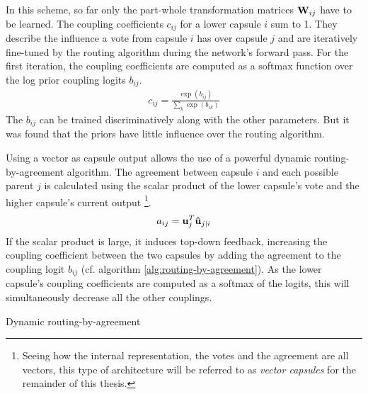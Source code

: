 In this scheme, so far only the part-whole transformation matrices $\vb{W}_{ij}$ have to be learned. The coupling coefficients $c_{ij}$ for a lower capsule $i$ sum to 1. They describe the influence a vote from capsule $i$ has over capsule $j$ and are iteratively fine-tuned by the routing algorithm during the network's forward pass. For the first iteration, the coupling coefficients are computed as a softmax function over the log prior coupling logits $b_{ij}$.
\begin{align}
    c_{ij} = \frac{\exp(b_{ij})}{\sum_k \exp(b_{ik})}
    \label{eq:coupling-coeff}
\end{align}
The $b_{ij}$ can be trained discriminatively along with the other parameters. But it was found that the priors have little influence over the routing algorithm.

Using a vector as capsule output allows the use of a powerful dynamic routing-by-agreement algorithm. The agreement between capsule $i$ and each possible parent $j$ is calculated using the scalar product of the lower capsule's vote and the higher capsule's current output \footnote{Seeing how the internal representation, the votes and the agreement are all vectors, this type of architecture will be referred to as \emph{vector capsules} for the remainder of this thesis.}.
\begin{align}
    a_{ij} = \vb{u}_j^T \vb{\hat{u}}_{j|i}
\end{align}
If the scalar product is large, it induces top-down feedback, increasing the coupling coefficient between the two capsules by adding the agreement to the coupling logit $b_{ij}$ (cf. algorithm \ref{alg:routing-by-agreement}). As the lower capsule's coupling coefficients are computed as a softmax of the logits, this will simultaneously decrease all the other couplings.
\begin{algorithm}
\caption{Dynamic routing-by-agreement}\label{alg:routing-by-agreement}
\begin{algorithmic}[1]
  \EndFor
\EndFor
{}
  \EndFor
  \EndFor
    \EndFor
  \EndFor
\EndFor
\State{}
\EndProcedure
\end{algorithmic}
\end{algorithm}
